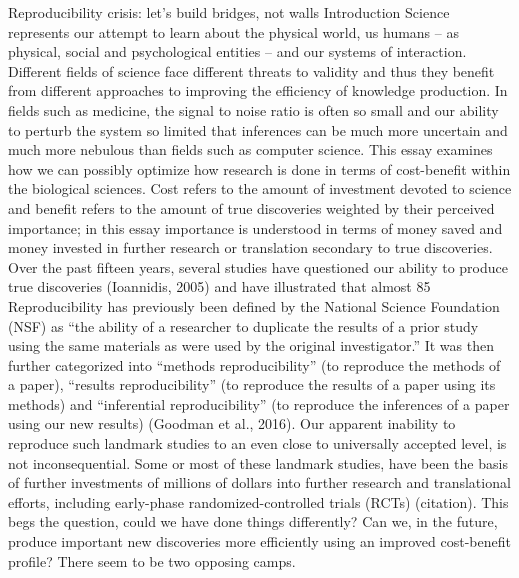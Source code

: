 \documentclass[12pt]{article}
\begin{document}
 
 
Reproducibility crisis: let’s build bridges, not walls
Introduction
Science represents our attempt to learn about the physical world, us humans – as physical, social and psychological entities – and our systems of interaction. Different fields of science face different threats to validity and thus they benefit from different approaches to improving the efficiency of knowledge production. In fields such as medicine, the signal to noise ratio is often so small and our ability to perturb the system so limited that inferences can be much more uncertain and much more nebulous than fields such as computer science. This essay examines how we can possibly optimize how research is done in terms of cost-benefit within the biological sciences.
Cost refers to the amount of investment devoted to science and benefit refers to the amount of true discoveries weighted by their perceived importance; in this essay importance is understood in terms of money saved and money invested in further research or translation secondary to true discoveries. Over the past fifteen years, several studies have questioned our ability to produce true discoveries (Ioannidis, 2005) and have illustrated that almost 85%
Reproducibility has previously been defined by the National Science Foundation (NSF) as “the ability of a researcher to duplicate the results of a prior study using the same materials as were used by the original investigator.” It was then further categorized into “methods reproducibility” (to reproduce the methods of a paper), “results reproducibility” (to reproduce the results of a paper using its methods) and “inferential reproducibility” (to reproduce the inferences of a paper using our new results) (Goodman et al., 2016). 
Our apparent inability to reproduce such landmark studies to an even close to universally accepted level, is not inconsequential. Some or most of these landmark studies, have been the basis of  further investments of millions of dollars into further research and translational efforts, including early-phase randomized-controlled trials (RCTs) (citation). This begs the question, could we have done things differently? Can we, in the future, produce important new discoveries more efficiently using an improved cost-benefit profile? There seem to be two opposing camps. 
\end{document}
